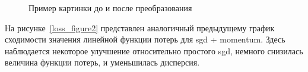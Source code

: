 \documentclass[oneside,final,12pt]{extreport}
\begin{document}
\begin{figure}[th]
\begin{minipage}[h]{0.49\linewidth}
\end{minipage}
\hfill
\begin{minipage}[h]{0.49\linewidth}
\end{minipage}
\caption{Пример картинки до и после преобразования}
\label{image2}
\end{figure}


На рисунке \,\ref{loss_figure2} представлен аналогичный предыдущему график сходимости значения линейной функции потерь для sgd + momentum. Здесь наблюдается некоторое улучшение относительно простого sgd, немного снизилась величина функции потерь, и уменьшилась дисперсия.
\end{document}
